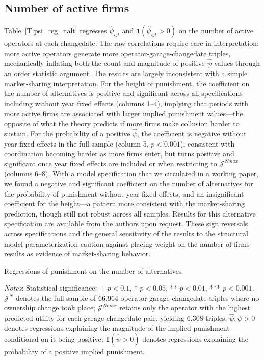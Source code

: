 \documentclass[12pt]{article}
\newcommand{\rootdir}{..}  %
\newcommand{\tables}{\rootdir/\rootdir/Output/tables}
\newcommand\fnote[1]{\captionsetup{font=small}\caption*{\emph{Notes}: #1}} %
\begin{document}
\subsection*{Number of active firms}

Table~\ref{T:psi_reg_nalt} regresses $\hat{\psi}_{ijt}$ and 
$\mathbf{1}(\hat{\psi}_{ijt}>0)$ on the number of active operators at each 
changedate. The raw correlations require care in interpretation: more active 
operators generate more operator-garage-changedate triples, mechanically 
inflating both the count and magnitude of positive $\hat{\psi}$ values 
through an order statistic argument. The results are largely inconsistent 
with a simple market-sharing interpretation. For the height of punishment, 
the coefficient on the number of alternatives is positive and significant 
across all specifications including without year fixed effects (columns 1--4), 
implying that periods with more active firms are associated with larger 
implied punishment values---the opposite of what the theory predicts if 
more firms make collusion harder to sustain. For the probability of a 
positive $\hat{\psi}$, the coefficient is negative without year fixed 
effects in the full sample (column 5, $p<0.001$), consistent with 
coordination becoming harder as more firms enter, but turns positive and 
significant once year fixed effects are included or when restricting to 
$\mathcal{J}^{Nmax}$ (columns 6--8). With a model specification that we circulated in a working paper, we found a negative and significant coefficient on the number of 
alternatives for the probability of punishment without year fixed effects, 
and an insignificant coefficient for the height---a pattern more consistent 
with the market-sharing prediction, though still not robust across all 
samples. Results for this alternative specification are available 
from the authors upon request. These sign reversals across specifications 
and the general sensitivity of the results to the structural model 
parameterization caution against placing weight on the number-of-firms 
results as evidence of market-sharing behavior. 

\begin{table}[!tb]
\centering
\caption{Regressions of punishment on the number of 
alternatives\label{T:psi_reg_nalt}}
\begin{adjustbox}{max width = \textwidth}

\end{adjustbox}
\fnote{Statistical significance: + $p<0.1$, * $p<0.05$, ** $p<0.01$, 
*** $p<0.001$. $\mathcal{J}^{N}$ denotes the full sample of 66,964 
operator-garage-changedate triples where no ownership change took place; 
$\mathcal{J}^{Nmax}$ retains only the operator with the highest predicted 
utility for each garage-changedate pair, yielding 6,308 triples. 
$\hat{\psi}:\hat{\psi}>0$ denotes regressions explaining the magnitude of the implied 
punishment conditional on it being positive; $\mathbf{1}(\hat{\psi}>0)$ denotes 
regressions explaining the probability of a positive implied punishment.}
\end{table}
\end{document}
